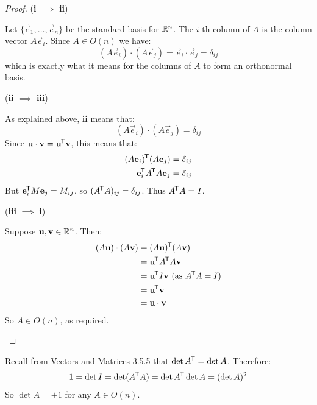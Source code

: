 \documentclass[../main.tex]{subfiles}
\begin{document}
\begin{proof}\par
  (\textbf{i} $\implies$ \textbf{ii})\par
  \begin{indentenvironment}
    Let $\{\vec{e}_1, \ldots, \vec{e}_n\}$ be the standard basis for $\mathbb{R}^{n}$.
    The $i$-th column of $A$ is the column vector $A \vec{e}_i$.
    Since $A \in O(n)$ we have:
    \[
      (A\vec{e}_i) \cdot (A\vec{e}_j) = \vec{e}_i \cdot \vec{e}_j = \delta_{i j}
    \]
    which is exactly what it means for the columns of $A$ to form an orthonormal basis.
  \end{indentenvironment}

  (\textbf{ii} $\implies$ \textbf{iii})\par
  \begin{indentenvironment}
    As explained above, \textbf{ii} means that:
    \[
      (A\vec{e}_i) \cdot (A\vec{e}_j) = \delta_{i j}
    \]
    Since $\mathbf{\bm{u}} \cdot \mathbf{\bm{v}} = \mathbf{\bm{u}}^{{\mkern-1.5mu\mathsf{T}}} \mathbf{\bm{v}}$, this means that:
    \begin{align*}
      (A\mathbf{\bm{e}}_i)^{{\mkern-1.5mu\mathsf{T}}} (A\mathbf{\bm{e}}_j) &= \delta_{i j} \\
      \mathbf{\bm{e}}^{{\mkern-1.5mu\mathsf{T}}}_{i} A^{{\mkern-1.5mu\mathsf{T}}} A \mathbf{\bm{e}}_j &= \delta_{i j}
    \end{align*}
    But $\mathbf{\bm{e}}^{{\mkern-1.5mu\mathsf{T}}}_{i}M\mathbf{\bm{e}}_j = M_{i j}$, so $(A^{{\mkern-1.5mu\mathsf{T}}}A)_{i j} = \delta_{i j}$.
    Thus $A^{{\mkern-1.5mu\mathsf{T}}} A = I$.
  \end{indentenvironment}

  (\textbf{iii} $\implies$ \textbf{i})\par
  \begin{indentenvironment}
    Suppose $\mathbf{\bm{u}}, \mathbf{\bm{v}} \in \mathbb{R}^{n}$.
    Then:
    \begin{align*}
      (A \mathbf{\bm{u}}) \cdot (A \mathbf{\bm{v}}) &= (A \mathbf{\bm{u}})^{{\mkern-1.5mu\mathsf{T}}} (A \mathbf{\bm{v}}) \\
                                    &= \mathbf{\bm{u}}^{{\mkern-1.5mu\mathsf{T}}} A^{{\mkern-1.5mu\mathsf{T}}} A \mathbf{\bm{v}} \\
                                    &= \mathbf{\bm{u}}^{{\mkern-1.5mu\mathsf{T}}} I \mathbf{\bm{v}} \text{ (as $A^{{\mkern-1.5mu\mathsf{T}}} A = I$)} \\
                                    &= \mathbf{\bm{u}}^{{\mkern-1.5mu\mathsf{T}}} \mathbf{\bm{v}} \\
                                    &= \mathbf{\bm{u}} \cdot \mathbf{\bm{v}}
    \end{align*}
    So $A \in O(n)$, as required.
  \end{indentenvironment}
\end{proof}
Recall from Vectors and Matrices 3.5.5 that $\det A^{{\mkern-1.5mu\mathsf{T}}} = \det A$.
Therefore:
\[
  1 = \det I = \det(A^{{\mkern-1.5mu\mathsf{T}}} A) = \det A^{{\mkern-1.5mu\mathsf{T}}} \det A = (\det A)^2
\]
So $\det A = \pm 1$ for any $A \in O(n)$.
\end{document}

